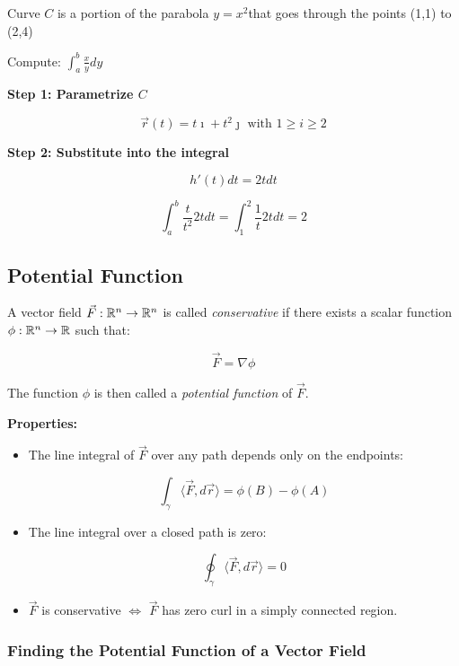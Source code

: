 Curve \(C\) is a portion of the parabola \(y = x^2\)that goes through the points (1,1) to (2,4)

Compute: \(\int_{a}^{b} \frac{x}{y} dy\)

\textbf{Step 1: Parametrize \(C\)}

\[
    \vec{r}(t) = t\imath + t^2 \jmath \text{ with } 1 \ge i \ge 2
\]

\textbf{Step 2: Substitute into the integral}

\[
    h'(t)dt= 2t dt
\]

\[
    \int_{a}^{b} \frac{t}{t^2} 2tdt = \int_{1}^{2} \frac{1}{t} 2tdt = 2 
\]

\subsection{Potential Function}

A vector field \( \vec{F} : \mathbb{R}^n \to \mathbb{R}^n \) is called \emph{conservative} if there exists a 
scalar function \( \phi : \mathbb{R}^n \to \mathbb{R} \) such that:

\[
    \vec{F} = \nabla \phi
\]

The function \( \phi \) is then called a \emph{potential function} of \( \vec{F} \).

\textbf{Properties:}

\begin{itemize}

    \item The line integral of \( \vec{F} \) over any path depends only on the endpoints:

        \[
            \int_\gamma \langle \vec{F}, d\vec{r} \rangle = \phi(B) - \phi(A)
        \]

    \item The line integral over a closed path is zero:

        \[
            \oint_\gamma \langle \vec{F}, d\vec{r} \rangle = 0
        \]

    \item \( \vec{F} \) is conservative \( \Leftrightarrow \) \( \vec{F} \) has zero curl in a 
    simply connected region.

\end{itemize}

\subsubsection{Finding the Potential Function of a Vector Field}

